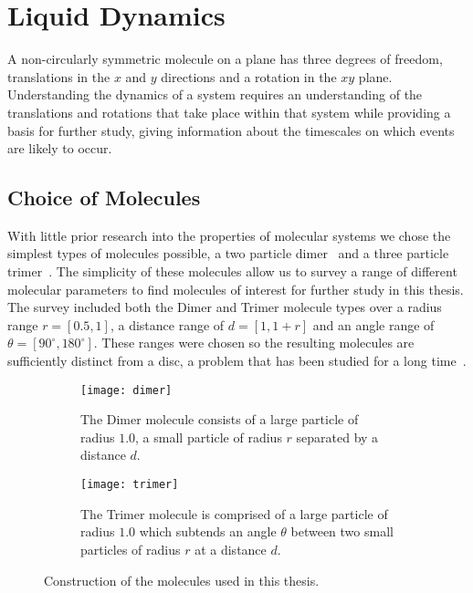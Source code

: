 \chapter{Liquid Dynamics}

A non-circularly symmetric molecule on a plane has three degrees of freedom, translations in the $x$ and $y$ directions and a rotation in the $xy$ plane. Understanding the dynamics of a system requires an understanding of the translations and rotations that take place within that system while providing a basis for further study, giving information about the timescales on which events are likely to occur.

\section{Choice of Molecules}

With little prior research into the properties of molecular systems we chose the simplest types of molecules possible, a two particle dimer~ and a three particle trimer~. The simplicity of these molecules allow us to survey a range of different molecular parameters to find molecules of interest for further study in this thesis. The survey included both the Dimer and Trimer molecule types over a radius range $r = [0.5,1]$, a distance range of $d = [1,1+r]$ and an angle range of $\theta = [90^\circ,180^\circ]$. These ranges were chosen so the resulting molecules are sufficiently distinct from a disc, a problem that has been studied for a long time~\cite{verlet:67}.

\begin{figure}
    \centering
    \begin{subfigure}[t]{0.48\textwidth}
        \texttt{[image: dimer]}
        \caption{The Dimer molecule consists of a large particle of radius $1.0$, a small particle of radius $r$ separated by a distance $d$.}
        \label{fig:dimer}
    \end{subfigure}\hfill
    \begin{subfigure}[t]{0.48\textwidth}
        \texttt{[image: trimer]}
        \caption{The Trimer molecule is comprised of a large particle of radius $1.0$ which subtends an angle $\theta$ between two small particles of radius $r$ at a distance $d$.}
        \label{fig:trimer}
    \end{subfigure}
    \caption{Construction of the molecules used in this thesis.}
    \label{fig:construction}
\end{figure}

